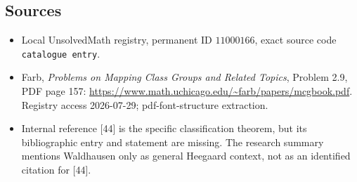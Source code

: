 \documentclass[11pt]{article}
\begin{document}
\subsection{Sources}
\begin{itemize}
\item Local UnsolvedMath registry, permanent ID \(11000166\), exact source code \texttt{catalogue entry}.
\item Farb, \emph{Problems on Mapping Class Groups and Related Topics}, Problem 2.9, PDF page 157: \url{https://www.math.uchicago.edu/~farb/papers/mcgbook.pdf}. Registry access 2026-07-29; pdf-font-structure extraction.
\item Internal reference [44] is the specific classification theorem, but its bibliographic entry and statement are missing. The research summary mentions Waldhausen only as general Heegaard context, not as an identified citation for [44].
\end{itemize}
\end{document}
